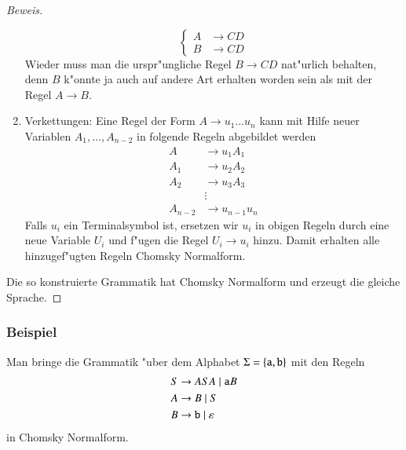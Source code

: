 \begin{proof}[Beweis]
\begin{enumerate}
\[\left\{
\begin{aligned}
A&\to CD\\
B&\to CD
\end{aligned}
\right.
\]
Wieder muss man die urspr"ungliche Regel $B\to CD$ nat"urlich
behalten, denn $B$ k"onnte ja auch auf andere Art erhalten worden
sein als mit der Regel $A\to B$.
\item Verkettungen: Eine Regel der Form $A\to u_1\dots u_n$ kann mit
Hilfe neuer Variablen $A_1,\dots,A_{n-2}$ in folgende Regeln abgebildet
werden
\begin{align*}
A&\to u_1A_1\\
A_1&\to u_2A_2\\
A_2&\to u_3A_3\\
&\vdots\\
A_{n-2}&\to u_{n-1}u_n
\end{align*}
Falls $u_i$ ein Terminalsymbol ist, ersetzen wir $u_i$ in obigen
Regeln durch eine neue Variable $U_i$ und f"ugen die Regel
$U_i\to u_i$ hinzu. Damit erhalten alle hinzugef"ugten Regeln
Chomsky Normalform.
\end{enumerate}
Die so konstruierte Grammatik hat Chomsky Normalform und erzeugt die
gleiche Sprache.
\end{proof}

\subsubsection{Beispiel}
Man bringe die Grammatik "uber dem Alphabet $\Sigma=\{{\tt a},{\tt b}\}$
mit den Regeln
\begin{align*}
S&\to ASA\;|\; {\tt a}B\\
A&\to B\;|\; S\\
B&\to{\tt b}\;|\; \varepsilon
\end{align*}
in Chomsky Normalform.

